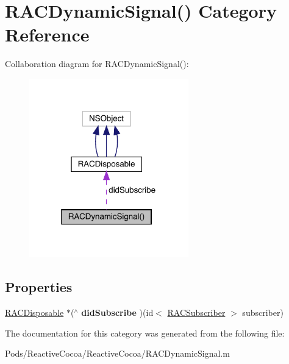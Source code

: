\hypertarget{category_r_a_c_dynamic_signal_07_08}{}\section{R\+A\+C\+Dynamic\+Signal() Category Reference}
\label{category_r_a_c_dynamic_signal_07_08}


Collaboration diagram for R\+A\+C\+Dynamic\+Signal()\+:\nopagebreak
\begin{figure}[H]
\begin{center}
\leavevmode
\includegraphics[width=196pt]{category_r_a_c_dynamic_signal_07_08__coll__graph}
\end{center}
\end{figure}
\subsection*{Properties}
\begin{DoxyCompactItemize}
\item 
\mbox{\label{category_r_a_c_dynamic_signal_07_08_aa97813f853ef461229effc2d7cd6f2de}} 
\mbox{\hyperlink{interface_r_a_c_disposable}{R\+A\+C\+Disposable}} $\ast$($^\wedge$ {\bfseries did\+Subscribe} )(id$<$ \mbox{\hyperlink{interface_r_a_c_subscriber}{R\+A\+C\+Subscriber}} $>$ subscriber)
\end{DoxyCompactItemize}


The documentation for this category was generated from the following file\+:\begin{DoxyCompactItemize}
\item 
Pods/\+Reactive\+Cocoa/\+Reactive\+Cocoa/R\+A\+C\+Dynamic\+Signal.\+m\end{DoxyCompactItemize}
